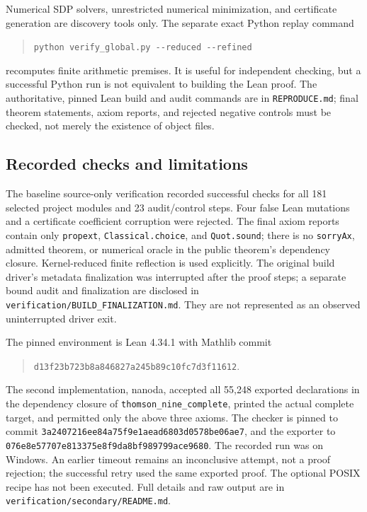 \documentclass[11pt]{article}
\theoremstyle{remark}
\newcommand{\code}[1]{{\small\nolinkurl{#1}}}
\newcommand{\pathcode}[1]{\nolinkurl{#1}}
\begin{document}
Numerical SDP solvers, unrestricted numerical minimization, and certificate
generation are discovery tools only. The separate exact Python replay command
\begin{quote}\small
\verb|python verify_global.py --reduced --refined|
\end{quote}
recomputes finite arithmetic premises. It is useful for independent checking,
but a successful Python run is not equivalent to building the Lean proof.
The authoritative, pinned Lean build and audit commands are in
\pathcode{REPRODUCE.md}; final theorem statements, axiom reports, and rejected
negative controls must be checked, not merely the existence of object files.

\subsection{Recorded checks and limitations}
The baseline source-only verification recorded successful checks for all
181 selected project modules and 23 audit/control steps. Four false Lean
mutations and a certificate coefficient corruption were rejected. The final
axiom reports contain only \code{propext}, \code{Classical.choice}, and
\code{Quot.sound}; there is no \code{sorryAx}, admitted theorem, or numerical
oracle in the public theorem's dependency closure. Kernel-reduced finite
reflection is used explicitly. The original build driver's metadata
finalization was interrupted after the proof steps; a separate bound audit
and finalization are disclosed in \pathcode{verification/BUILD_FINALIZATION.md}.
They are not represented as an observed uninterrupted driver exit.

The pinned environment is Lean 4.34.1 with Mathlib commit
\begin{quote}\small
\pathcode{d13f23b723b8a846827a245b89c10fc7d3f11612}.
\end{quote}
The second implementation, nanoda, accepted all 55,248 exported declarations
in the dependency closure of \code{thomson_nine_complete}, printed the actual
complete target, and permitted only the above three axioms. The checker is
pinned to commit
\pathcode{3a2407216ee84a75f9e1aead6803d0578be06ae7}, and the exporter to
\pathcode{076e8e57707e813375e8f9da8bf989799ace9680}. The recorded run was on
Windows. An earlier timeout remains an inconclusive attempt, not a proof
rejection; the successful retry used the same exported proof. The optional
POSIX recipe has not been executed. Full details and raw output are in
\pathcode{verification/secondary/README.md}.
\end{document}
